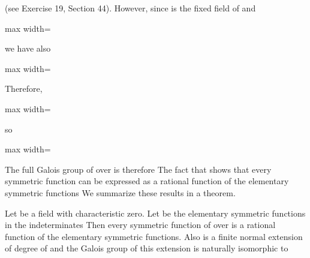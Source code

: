 \documentclass[11pt,oneside]{article}
\begin{document}
\begin{BookBody}

\noindent (see Exercise 19, Section 44). However, since  is the fixed field of  and

\begin{center}\begin{adjustbox}{max width=\linewidth}\end{adjustbox}\end{center}

\noindent we have also

\begin{center}\begin{adjustbox}{max width=\linewidth}\end{adjustbox}\end{center}

\noindent Therefore,

\begin{center}\begin{adjustbox}{max width=\linewidth}\end{adjustbox}\end{center}

\noindent so

\begin{center}\begin{adjustbox}{max width=\linewidth}\end{adjustbox}\end{center}

\noindent The full Galois group of  over  is therefore  The fact that  shows that every symmetric function can be expressed as a rational function of the elementary symmetric functions  We summarize these results in a theorem.

 Let  be a field with characteristic zero. Let  be the elementary symmetric functions in the indeterminates  Then every symmetric function of  over  is a rational function of the elementary symmetric functions. Also is a finite normal extension of degree  of  and the Galois group of this extension is naturally isomorphic to 


\end{BookBody}
\end{document}
